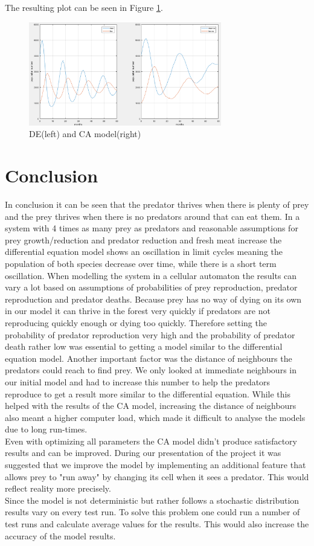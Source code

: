 \documentclass[a4paper,12pt]{article}
\begin{document}
The resulting plot can be seen in Figure \ref{Task5}.

\begin{figure}[tb]
\centering
\includegraphics[width=0.75\textwidth]{Task5}  
\caption[Task5]{DE(left) and CA model(right)}
\label{Task5}
\end{figure} 

\section{Conclusion}
In conclusion it can be seen that the predator thrives when there is plenty of prey and the prey thrives when there is no
predators around that can eat them. In a system with 4 times as many prey as predators and reasonable assumptions for prey growth/reduction and predator reduction and fresh meat increase the differential equation model shows an oscillation in limit cycles meaning the population of both species decrease over time, while there is a short term oscillation. When modelling the system in a cellular automaton the results can vary a lot based on assumptions of probabilities of prey reproduction, predator reproduction and predator deaths. Because prey has no way of dying on its own in our model it can thrive in the forest very quickly if predators are not reproducing quickly enough or dying too quickly. Therefore setting the probability of predator reproduction very high and the probability of predator death rather low was essential to getting a model similar to the differential equation model. Another important factor was the distance of neighbours the predators could reach to find prey. We only looked at immediate neighbours in our initial model and had to increase this number to help the predators reproduce to get a result more similar to the differential equation. While this helped with the results of the CA model, increasing the distance of neighbours also meant a higher computer load, which made it difficult to analyse the models due to long run-times.\\

Even with optimizing all parameters the CA model didn't produce satisfactory results and can be improved. During our presentation of the project it was suggested that we improve the model by implementing an additional feature that allows prey to "run away" by changing its cell when it sees a predator. This would reflect reality more precisely.\\

Since the model is not deterministic but rather follows a stochastic distribution results vary on every test run. To solve this problem one could run a number of test runs and calculate average values for the results. This would also increase the accuracy of the model results. 
\end{document}
